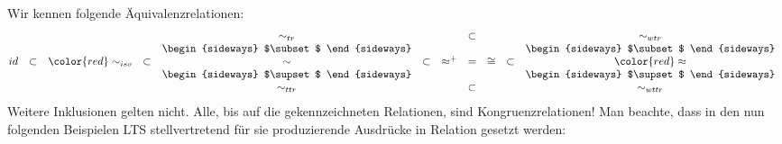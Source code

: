 \documentclass[10pt, landscape]{article}
\begin{document}
Wir kennen folgende Äquivalenzrelationen:
\newcommand{\ssubset}{\begin{sideways} $\subset$ \end{sideways}}
\newcommand{\ssupset}{\begin{sideways} $\supset$ \end{sideways}}
\newcommand{\noCongr}[1]{{\color{red}#1}}
\[\begin{array} {@{}ccccccccccc}
    &         &                      &         & \sim_{tr}  &         &        & \subset &   &         & \sim_{wtr}        \\
    &         &                      &         & \ssubset   &         &            & &       &         & \ssubset          \\
id  & \subset & \noCongr{\sim_{iso}} & \subset & \sim       & \subset &  \approx^+ &=& \cong & \subset & \noCongr{\approx} \\ 
    &         &                      &         & \ssupset   &         &            & &       &         & \ssupset          \\
    &         &                      &         & \sim_{ttr} &         &        & \subset &   &         & \sim_{wttr}       \\
\end{array}\]
Weitere Inklusionen gelten nicht. Alle, bis auf die \noCongr{gekennzeichneten} Relationen, sind Kongruenzrelationen!
Man beachte, dass in den nun folgenden Beispielen LTS stellvertretend für sie produzierende Ausdrücke in Relation gesetzt werden:
\vspace{0.3cm}

\begin{column}{.44}
	\small
	\vspace {3cm}
	
	\begin{column}{.5}
		\hspace{0.5cm}
	\end{column}

\hspace{2cm}	

	\small
	
\hspace{1cm}	

	
\end{column}
\end{document}
